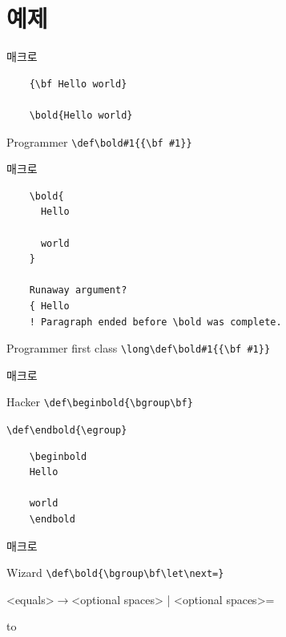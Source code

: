 \documentclass{beamer}
\begin{document}
%
\section{예제}


%
\begin{frame}[fragile]{\texttt{\string\bold} 매크로}
  \begin{verbatim}
    {\bf Hello world}
    
    \bold{Hello world}
  \end{verbatim}
  \begin{alertblock}{Programmer}
    \verb+\def\bold#1{{\bf #1}}+
  \end{alertblock}
\end{frame}


%
\begin{frame}[fragile]{\texttt{\string\bold} 매크로}
  \begin{verbatim}
    \bold{
      Hello

      world
    }

    Runaway argument?
    { Hello
    ! Paragraph ended before \bold was complete.
  \end{verbatim}
  \begin{alertblock}{Programmer first class}
    \verb+\long\def\bold#1{{\bf #1}}+
  \end{alertblock}
\end{frame}


%
\begin{frame}[fragile]{\texttt{\string\bold} 매크로}
  \begin{alertblock}{Hacker}
    \verb+\def\beginbold{\bgroup\bf}+
    
    \verb+\def\endbold{\egroup}+
  \end{alertblock}

  \begin{verbatim}
    \beginbold
    Hello

    world
    \endbold
  \end{verbatim}
\end{frame}


%
\begin{frame}[fragile]{\texttt{\string\bold} 매크로}
  \begin{alertblock}{Wizard}
    \verb+\def\bold{\bgroup\bf\let\next=}+
  \end{alertblock}
  \medskip
  <equals>$\rightarrow$<optional spaces> | <optional spaces>=
  
  \hbox to
  \medskip
\end{frame}
\end{document}
